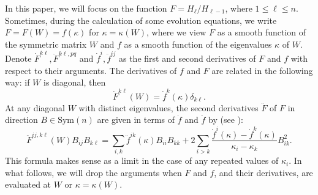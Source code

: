 \documentclass[11pt,reqno]{amsart}
\theoremstyle{definition}
\theoremstyle{remark}
\numberwithin{equation}{section}
\renewcommand{\(}{\left(}
\renewcommand{\)}{\right)}
\renewcommand{\-}{\overline}
\begin{document}
In this paper, we will focus on the function $F={H_\ell}/{H_{\ell-1}}$, where $1\leq \ell\leq n$. Sometimes, during the calculation of some evolution equations, we write $F=F(W)=f(\kappa)$ for $\kappa=\kappa(W)$, where we view $F$ as a smooth function of the symmetric matrix $W$ and $f$ as a smooth function of the eigenvalues $\kappa$ of $W$. Denote $\dot{F}^{k\ell}, \ddot{F}^{k\ell,pq}$ and $\dot{f}^i, \ddot{f}^{ij}$ as the first and second derivatives of $F$ and $f$ with respect to their arguments. The derivatives of $f$ and $F$ are related in the following way: if $W$ is diagonal, then
\begin{equation*}
  \dot{F}^{k\ell}(W)=\dot{f}^k(\kappa)\delta_{k\ell}.
\end{equation*}
At any diagonal $W$ with distinct eigenvalues, the second derivatives $\ddot{F}$ of $F$ in direction $B\in \mathrm{Sym}(n)$ are given in terms of $\dot{f}$ and $\ddot{f}$ by  (see \cite{And2007}):
\begin{equation}\label{s2:F-ddt}
  \ddot{F}^{ij,k\ell}(W)B_{ij}B_{k\ell}=\sum_{i,k}\ddot{f}^{ik}(\kappa)B_{ii}B_{kk}+2\sum_{i>k}\frac{\dot{f}^i(\kappa)-\dot{f}^k(\kappa)}{\kappa_i-\kappa_k}B_{ik}^2.
\end{equation}
This formula makes sense as a limit in the case of any repeated values of $\kappa_i$. In what follows, we will drop the arguments when $F$ and $f$, and their
derivatives, are evaluated at $W$ or $\kappa=\kappa(W)$.
\end{document}
